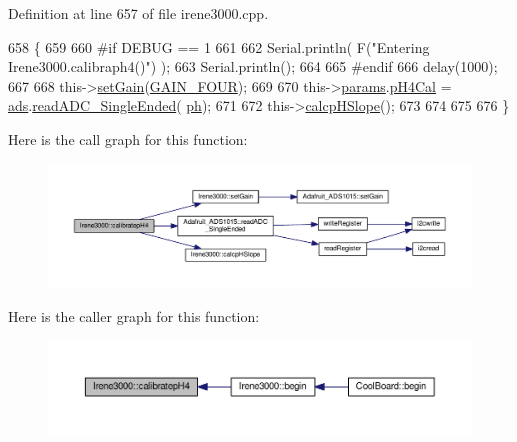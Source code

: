 Definition at line 657 of file irene3000.\+cpp.


\begin{DoxyCode}
658 \{
659 
660 \textcolor{preprocessor}{#if DEBUG == 1 }
661 
662     Serial.println( F(\textcolor{stringliteral}{"Entering Irene3000.calibraph4()"}) );
663     Serial.println();
664 
665 \textcolor{preprocessor}{#endif }
666     delay(1000);
667 
668     this->\hyperlink{class_irene3000_aff7c5da186b388e7272e63ff88a20c34}{setGain}(\hyperlink{_cool_adafruit___a_d_s1015_8h_a3d6c0e15829a207b9155890811fa4781a33fa5521f4e806b7438052fcdbbf8660}{GAIN\_FOUR});
669 
670     this->\hyperlink{class_irene3000_a136585a5ee7f9ac6ab52175fa153f8e3}{params}.\hyperlink{struct_irene3000_1_1parameters___t_a1144de6fb54eb3e1dd2a3d8c2afc97dc}{pH4Cal} =  \hyperlink{class_irene3000_a1215e77ba761c9908d80d691f149e135}{ads}.\hyperlink{class_adafruit___a_d_s1015_a40f38b9e1f3ec397c0670dd632510235}{readADC\_SingleEnded}(
      \hyperlink{_irene3000_8h_af771ceafe0e6524dd8497d4305dfe778}{ph});
671 
672     this->\hyperlink{class_irene3000_a81f6a79e546679692053f7ac1af49613}{calcpHSlope}();
673 
674 
675 
676 \}
\end{DoxyCode}
Here is the call graph for this function\+:\nopagebreak
\begin{figure}[H]
\begin{center}
\leavevmode
\includegraphics[width=350pt]{d6/d03/class_irene3000_aa140dd026922a04981edfd04d46cabbe_cgraph}
\end{center}
\end{figure}
Here is the caller graph for this function\+:\nopagebreak
\begin{figure}[H]
\begin{center}
\leavevmode
\includegraphics[width=350pt]{d6/d03/class_irene3000_aa140dd026922a04981edfd04d46cabbe_icgraph}
\end{center}
\end{figure}
\mbox{\label{class_irene3000_a1d3299202e4cb7afcff9c9e3e95d94c1}} 
